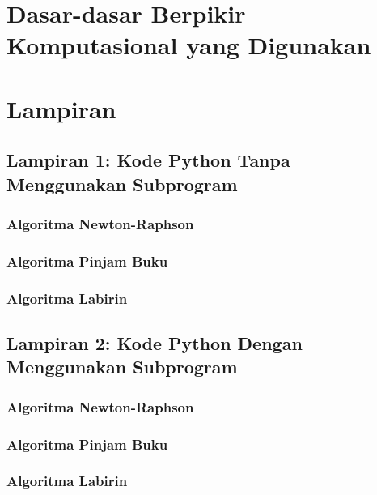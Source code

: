 \documentclass[a4paper, 12pt]{article}
\begin{document}

\newpage
\renewcommand{\contentsname}{DAFTAR ISI}
\tableofcontents
\newpage
\section{Dasar-dasar Berpikir Komputasional yang Digunakan}



\section{Lampiran}
\subsection{Lampiran 1: Kode Python Tanpa Menggunakan Subprogram}
\subsubsection{Algoritma Newton-Raphson}

\subsubsection{Algoritma Pinjam Buku}

\subsubsection{Algoritma Labirin}
 
\subsection{Lampiran 2: Kode Python Dengan Menggunakan Subprogram}
\subsubsection{Algoritma Newton-Raphson}

\subsubsection{Algoritma Pinjam Buku}

\subsubsection{Algoritma Labirin}

\end{document}
